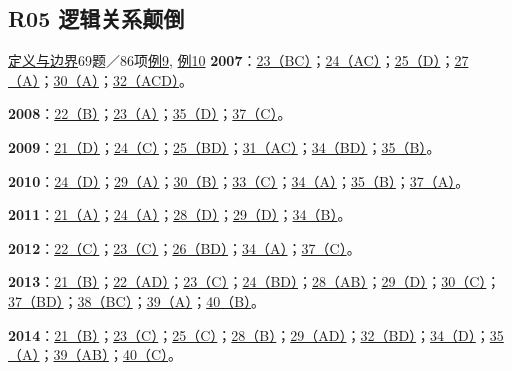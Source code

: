 \documentclass[11pt,a4paper]{article}
\begin{document}
\subsection{R05 逻辑关系颠倒}\label{class-R05}
\noindent \hyperref[cat-R05]{定义与边界}\quad 69题／86项\quad \hyperref[case-2007-T1-Q23]{例9}, \hyperref[case-2010-T3-Q35]{例10}
\noindent\textbf{2007}：\hyperref[idx-2007-T1-Q23]{23（BC）}；\hyperref[idx-2007-T1-Q24]{24（AC）}；\hyperref[idx-2007-T1-Q25]{25（D）}；\hyperref[idx-2007-T2-Q27]{27（A）}；\hyperref[idx-2007-T2-Q30]{30（A）}；\hyperref[idx-2007-T3-Q32]{32（ACD）}。\par
\noindent\textbf{2008}：\hyperref[idx-2008-T1-Q22]{22（B）}；\hyperref[idx-2008-T1-Q23]{23（A）}；\hyperref[idx-2008-T3-Q35]{35（D）}；\hyperref[idx-2008-T4-Q37]{37（C）}。\par
\noindent\textbf{2009}：\hyperref[idx-2009-T1-Q21]{21（D）}；\hyperref[idx-2009-T1-Q24]{24（C）}；\hyperref[idx-2009-T1-Q25]{25（BD）}；\hyperref[idx-2009-T3-Q31]{31（AC）}；\hyperref[idx-2009-T3-Q34]{34（BD）}；\hyperref[idx-2009-T3-Q35]{35（B）}。\par
\noindent\textbf{2010}：\hyperref[idx-2010-T1-Q24]{24（D）}；\hyperref[idx-2010-T2-Q29]{29（A）}；\hyperref[idx-2010-T2-Q30]{30（B）}；\hyperref[idx-2010-T3-Q33]{33（C）}；\hyperref[idx-2010-T3-Q34]{34（A）}；\hyperref[idx-2010-T3-Q35]{35（B）}；\hyperref[idx-2010-T4-Q37]{37（A）}。\par
\noindent\textbf{2011}：\hyperref[idx-2011-T1-Q21]{21（A）}；\hyperref[idx-2011-T1-Q24]{24（A）}；\hyperref[idx-2011-T2-Q28]{28（D）}；\hyperref[idx-2011-T2-Q29]{29（D）}；\hyperref[idx-2011-T3-Q34]{34（B）}。\par
\noindent\textbf{2012}：\hyperref[idx-2012-T1-Q22]{22（C）}；\hyperref[idx-2012-T1-Q23]{23（C）}；\hyperref[idx-2012-T2-Q26]{26（BD）}；\hyperref[idx-2012-T3-Q34]{34（A）}；\hyperref[idx-2012-T4-Q37]{37（C）}。\par
\noindent\textbf{2013}：\hyperref[idx-2013-T1-Q21]{21（B）}；\hyperref[idx-2013-T1-Q22]{22（AD）}；\hyperref[idx-2013-T1-Q23]{23（C）}；\hyperref[idx-2013-T1-Q24]{24（BD）}；\hyperref[idx-2013-T2-Q28]{28（AB）}；\hyperref[idx-2013-T2-Q29]{29（D）}；\hyperref[idx-2013-T2-Q30]{30（C）}；\hyperref[idx-2013-T4-Q37]{37（BD）}；\hyperref[idx-2013-T4-Q38]{38（BC）}；\hyperref[idx-2013-T4-Q39]{39（A）}；\hyperref[idx-2013-T4-Q40]{40（B）}。\par
\noindent\textbf{2014}：\hyperref[idx-2014-T1-Q21]{21（B）}；\hyperref[idx-2014-T1-Q23]{23（C）}；\hyperref[idx-2014-T1-Q25]{25（C）}；\hyperref[idx-2014-T2-Q28]{28（B）}；\hyperref[idx-2014-T2-Q29]{29（AD）}；\hyperref[idx-2014-T3-Q32]{32（BD）}；\hyperref[idx-2014-T3-Q34]{34（D）}；\hyperref[idx-2014-T3-Q35]{35（A）}；\hyperref[idx-2014-T4-Q39]{39（AB）}；\hyperref[idx-2014-T4-Q40]{40（C）}。\par
\end{document}
